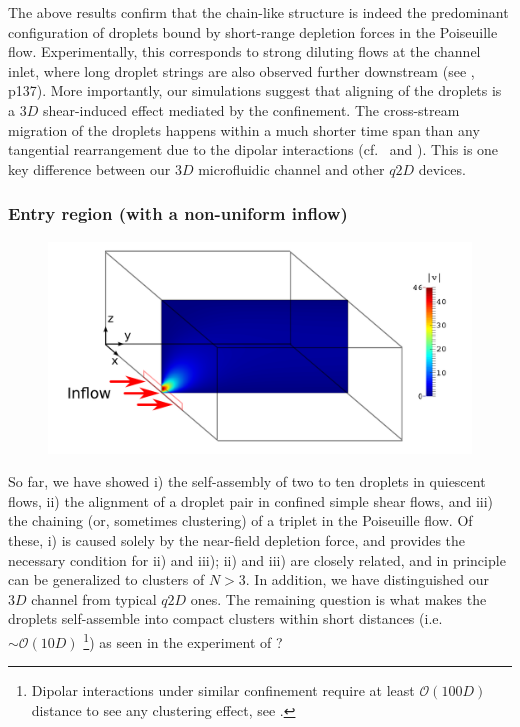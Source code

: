 The above results confirm that the chain-like structure is indeed the predominant configuration of droplets bound by short-range depletion forces in the Poiseuille flow. Experimentally, this corresponds to strong diluting flows at the channel inlet, where long droplet strings are also observed further downstream (see  \cite{shen_thesis}, p137). More importantly, our simulations suggest that aligning of the droplets is a $3D$ shear-induced effect mediated by the confinement. The cross-stream migration of the droplets happens within a much shorter time span than any tangential rearrangement due to the dipolar interactions (cf.\  \cite{Diamant} and  \cite{Fouxon_2017}). This is one key difference between our $3D$ microfluidic channel and other $q2D$ devices. 


\subsubsection{Entry region (with a non-uniform inflow)} \label{sec:non-uniform}

\begin{figure}[t]
 \centering
 \includegraphics[width=.9\columnwidth]{figs/non-uniform_inflow1.pdf}
 \caption{}
 \label{fig: non-uniform sketch}
\end{figure}

So far, we have showed i) the self-assembly of two to ten droplets in quiescent flows, ii) the alignment of a droplet pair in confined simple shear flows, and iii) the chaining (or, sometimes clustering) of a triplet in the Poiseuille flow. Of these, i) is caused solely by the near-field depletion force, and provides the necessary condition for ii) and iii); ii) and iii) are closely related, and in principle can be generalized to clusters of $N>3$. In addition, we have distinguished our $3D$ channel from typical $q2D$ ones. The remaining question is what makes the droplets self-assemble into compact clusters within short distances (i.e.\ $\sim \mathcal{O}(10D)$ \footnote[4]{Dipolar interactions under similar confinement require at least $\mathcal{O}(100D)$ distance to see any clustering effect, see \cite{Fouxon_2017}.}) as seen in the experiment of   \cite{Shen_2016AS}?

